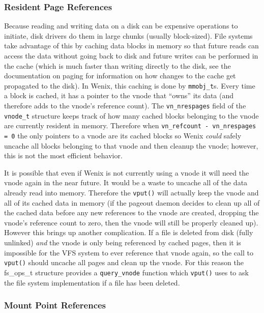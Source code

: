 \subsubsection{Resident Page References}


Because reading and writing data on a disk can be expensive operations to initiate, disk drivers do them in large chunks (usually block-sized). File systems take advantage of this by caching data blocks in memory so that future reads can access the data without going back to disk and future writes can be performed in the cache (which is much faster than writing directly to the disk, see the documentation on paging for information on how changes to the cache get propagated to the disk). In Wenix, this caching is done by \texttt{mmobj\_t}s. Every time a block is cached, it has a pointer to the vnode that ``owns'' its data (and therefore adds to the vnode's reference count). The \texttt{vn\_nrespages} field of the \texttt{vnode\_t} structure keeps track of how many cached blocks belonging to the vnode are currently resident in memory. Therefore when \texttt{vn\_refcount - vn\_nrespages = 0} the only pointers to a vnode are its cached blocks so Wenix \emph{could} safely uncache all blocks belonging to that vnode and then cleanup the vnode; however, this is not the most efficient behavior.

It is possible that even if Wenix is not currently using a vnode it will need the vnode again in the near future. It would be a waste to uncache all of the data already read into memory. Therefore the \texttt{vput()} will actually keep the vnode and all of its cached data in memory (if the pageout daemon decides to clean up all of the cached data before any new references to the vnode are created, dropping the vnode's reference count to zero, then the vnode will still be properly cleaned up). However this brings up another complication. If a file is deleted from disk (fully unlinked) \emph{and} the vnode is only being referenced by cached pages, then it is impossible for the VFS system to ever reference that vnode again, so the call to \texttt{vput()} should uncache all pages and clean up the vnode. For this reason the fs\_ops\_t structure provides a \texttt{query\_vnode} function which \texttt{vput()} uses to ask the file system implementation if a file has been deleted.

\subsubsection{Mount Point References}

